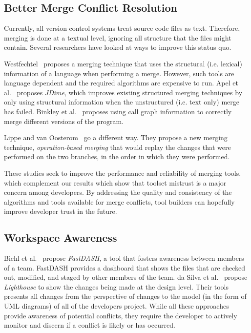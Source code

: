 \subsection{Better Merge Conflict Resolution}

Currently, all version control systems treat source code files as text.
Therefore, merging is done at a textual level, ignoring all structure that the files might contain.
Several researchers have looked at ways to improve this status quo.

Westfechtel~\cite{westfechtel_structure-oriented_1991} proposes a merging technique that uses the structural (i.e. lexical) information of a language when performing a merge. However, such tools are language dependent and the required algorithms are expensive to run.
Apel et al.~\cite{apel_structured_2012-1, apel_semistructured_2011} proposes \emph{JDime}, which improves existing structured merging techniques by only using structural information when the unstructured (i.e. text only) merge has failed.
Binkley et al.~\cite{binkley_program_1995} proposes using call graph information to correctly merge different versions of the program.

Lippe and van Oosterom~\cite{lippe_operation-based_1992} go a different way.
They propose a new merging technique, \emph{operation-based merging} that would replay the changes that were performed on the two branches, in the order in which they were performed.

These studies seek to improve the performance and reliability of merging tools, which complement our results which show that toolset mistrust is a major concern among developers.
By addressing the quality and consistency of the algorithms and tools available for merge conflicts, tool builders can hopefully improve developer trust in the future.

\subsection{Workspace Awareness} 

Biehl et al.~\cite{biehl_fastdash:_2007} propose \emph{FastDASH}, a tool that fosters awareness between members of a team. 
FastDASH provides a dashboard that shows the files that are checked out, modified, and staged by other members of the team.
da Silva et al.~\cite{da_silva_lighthouse:_2006} propose \emph{Lighthouse} to show the changes being made at the design level.
Their tools presents all changes from the perspective of changes to the model (in the form of UML diagrams) of all of the developers project.
While all these approaches provide awareness of potential conflicts, they require the developer to actively monitor and discern if a conflict is likely or has occurred.

